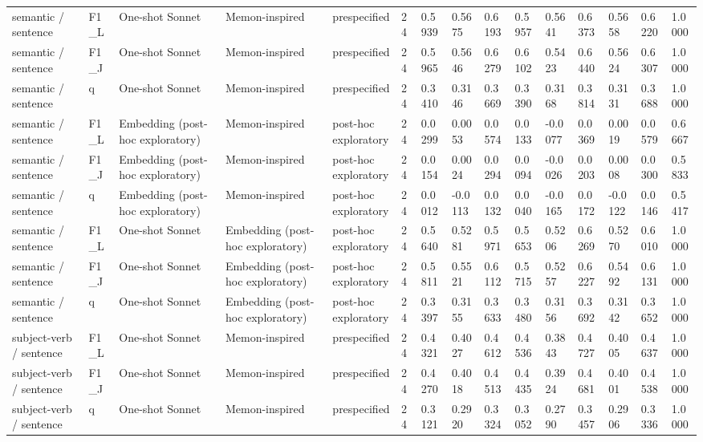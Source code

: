\begin{table}[t]
{\begin{tabular}{lllllllllllllll}
semantic / sentence & F1\_L & One-shot Sonnet & Memon-inspired & prespecified & 24 & 0.5939 & 0.5675 & 0.6193 & 0.5957 & 0.5641 & 0.6373 & 0.5658 & 0.6220 & 1.0000 \\
semantic / sentence & F1\_J & One-shot Sonnet & Memon-inspired & prespecified & 24 & 0.5965 & 0.5646 & 0.6279 & 0.6102 & 0.5423 & 0.6440 & 0.5624 & 0.6307 & 1.0000 \\
semantic / sentence & q & One-shot Sonnet & Memon-inspired & prespecified & 24 & 0.3410 & 0.3146 & 0.3669 & 0.3390 & 0.3168 & 0.3814 & 0.3131 & 0.3688 & 1.0000 \\
semantic / sentence & F1\_L & Embedding (post-hoc exploratory) & Memon-inspired & post-hoc exploratory & 24 & 0.0299 & 0.0053 & 0.0574 & 0.0133 & -0.0077 & 0.0369 & 0.0019 & 0.0579 & 0.6667 \\
semantic / sentence & F1\_J & Embedding (post-hoc exploratory) & Memon-inspired & post-hoc exploratory & 24 & 0.0154 & 0.0024 & 0.0294 & 0.0094 & -0.0026 & 0.0203 & 0.0008 & 0.0300 & 0.5833 \\
semantic / sentence & q & Embedding (post-hoc exploratory) & Memon-inspired & post-hoc exploratory & 24 & 0.0012 & -0.0113 & 0.0132 & 0.0040 & -0.0165 & 0.0172 & -0.0122 & 0.0146 & 0.5417 \\
semantic / sentence & F1\_L & One-shot Sonnet & Embedding (post-hoc exploratory) & post-hoc exploratory & 24 & 0.5640 & 0.5281 & 0.5971 & 0.5653 & 0.5206 & 0.6269 & 0.5270 & 0.6010 & 1.0000 \\
semantic / sentence & F1\_J & One-shot Sonnet & Embedding (post-hoc exploratory) & post-hoc exploratory & 24 & 0.5811 & 0.5521 & 0.6112 & 0.5715 & 0.5257 & 0.6227 & 0.5492 & 0.6131 & 1.0000 \\
semantic / sentence & q & One-shot Sonnet & Embedding (post-hoc exploratory) & post-hoc exploratory & 24 & 0.3397 & 0.3155 & 0.3633 & 0.3480 & 0.3156 & 0.3692 & 0.3142 & 0.3652 & 1.0000 \\
subject-verb / sentence & F1\_L & One-shot Sonnet & Memon-inspired & prespecified & 24 & 0.4321 & 0.4027 & 0.4612 & 0.4536 & 0.3843 & 0.4727 & 0.4005 & 0.4637 & 1.0000 \\
subject-verb / sentence & F1\_J & One-shot Sonnet & Memon-inspired & prespecified & 24 & 0.4270 & 0.4018 & 0.4513 & 0.4435 & 0.3924 & 0.4681 & 0.4001 & 0.4538 & 1.0000 \\
subject-verb / sentence & q & One-shot Sonnet & Memon-inspired & prespecified & 24 & 0.3121 & 0.2920 & 0.3324 & 0.3052 & 0.2790 & 0.3457 & 0.2906 & 0.3336 & 1.0000 \\

\end{tabular}}
\end{table}
